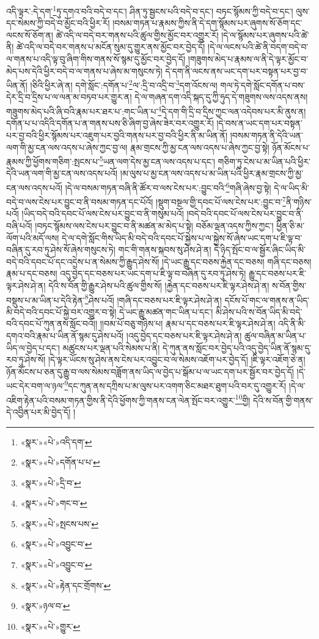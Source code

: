 འདི་ལྟར་:དེ་དག་\footnote{«སྣར་»«པེ་»འདི་དག་}ཏུ་དགའ་བའི་བདེ་བ་དང་། ཤིན་ཏུ་སྦྱངས་པའི་བདེ་བ་དང་། བཏང་སྙོམས་ཀྱི་བདེ་བ་དང་། ལུས་དང་སེམས་ཀྱི་བདེ་བ་མྱོང་བའི་ཕྱིར་རོ། །བསམ་གཏན་པ་རྣམས་ཀྱིས་ནི་དེ་དག་སྙོམས་པར་ཞུགས་སོ་ཅོག་དང་ལངས་སོ་ཅོག་ན། ཚེ་འདི་ལ་བདེ་བར་གནས་པའི་ཚུལ་གྱིས་མྱོང་བར་འགྱུར་རོ། །དེ་ལ་སྙོམས་པར་ཞུགས་པའི་ཚེ་ནི། ཚེ་འདི་ལ་བདེ་བར་གནས་པ་མངོན་སུམ་དུ་གྱུར་ནས་མྱོང་བར་བྱེད་དོ། །དེ་ལ་ལངས་པའི་ཚེ་ནི་བདག་བདེ་བ་ལ་གནས་པ་འདི་ལྟ་བུ་ཞིག་གིས་གནས་སོ་སྙམ་དུ་མྱོང་བར་བྱེད་དོ། །གཟུགས་མེད་པ་རྣམས་ལ་ནི་དེ་ལྟར་མྱོང་བ་མེད་པས་དེའི་ཕྱིར་བདེ་བ་ལ་གནས་པ་ཞེས་མ་གསུངས་ཏེ། དེ་དག་ནི་ལངས་ནས་ཡང་དག་པར་བསྟན་པར་བྱ་བ་ཡིན་ནོ། །ཅིའི་ཕྱིར་ཞེ་ན། དགེ་སློང་:དགོན་པ་\footnote{«སྣར་»«པེ་»དགོན་པ་པ་}ལ་:དྲི་བ་འདྲི་བ་\footnote{«སྣར་»«པེ་»དྲི་བ་}དག་འོངས་ལ། གལ་ཏེ་དགེ་སློང་དགོན་པ་བས་དེར་དྲི་བ་དྲིས་པ་ལ་ལན་མ་བཏབ་པར་གྱུར་ན། དེ་ལ་གཞན་དག་འདི་སྐད་དུ་ཀྱི་ཧུད་དེ་གཟུགས་ལས་འདས་ནས། གཟུགས་མེད་པའི་ཞི་བའི་རྣམ་པར་ཐར་པ་:གང་ཡིན་པ་\footnote{«སྣར་»«པེ་»གང་བ་}དེ་དག་གི་དྲི་བ་དྲིས་ཀྱང་ལན་འདེབས་པར་མི་ནུས་ན། དགོན་པ་པ་འདིའི་དགོན་པ་ན་གནས་པས་ཅི་ཞིག་བྱ་ཞེས་ཟེར་བར་འགྱུར་རོ། །དེ་བས་ན་ཡང་དག་པར་བསྟན་པར་བྱ་བའི་ཕྱིར་སྙོམས་པར་འཇུག་པར་བྱའི་གནས་པར་བྱ་བའི་ཕྱིར་ནི་མ་ཡིན་ནོ། །བསམ་གཏན་ནི་དེའི་ཡན་ལག་གི་མྱ་ངན་ལས་འདས་པ་ཞེས་ཀྱང་བྱ་ལ། རྣམ་གྲངས་ཀྱི་མྱ་ངན་ལས་འདས་པ་ཞེས་ཀྱང་བྱ་སྟེ། ཉོན་མོངས་པ་རྣམས་ཀྱི་ཕྱོགས་གཅིག་:སྤངས་པ་\footnote{«སྣར་»«པེ་»སྤངས་པས་}ཡན་ལག་དེས་མྱ་ངན་ལས་འདས་པ་དང་། གཅིག་ཏུ་ངེས་པ་མ་ཡིན་པའི་ཕྱིར་དེའི་ཡན་ལག་གི་མྱ་ངན་ལས་འདས་པའོ། །མ་ལུས་པ་མྱ་ངན་ལས་འདས་པ་མ་ཡིན་པའི་ཕྱིར་རྣམ་གྲངས་ཀྱི་མྱ་ངན་ལས་འདས་པའོ། །དེ་ལ་བསམ་གཏན་བཞི་ནི་ཚོར་བ་ལས་ངེས་པར་:བྱུང་བའི་\footnote{«སྣར་»«པེ་»འབྱུང་བ་}གཞི་ཞེས་བྱ་སྟེ། དེ་ལ་ཡིད་མི་བདེ་བ་ལས་ངེས་པར་བྱུང་བ་ནི་བསམ་གཏན་དང་པོའོ། །སྡུག་བསྔལ་གྱི་དབང་པོ་ལས་ངེས་པར་:བྱུང་བ་\footnote{«སྣར་»«པེ་»འབྱུང་བ་}ནི་གཉིས་པའོ། །ཡིད་བདེ་བའི་དབང་པོ་ལས་ངེས་པར་བྱུང་བ་ནི་གསུམ་པའོ། །བདེ་བའི་དབང་པོ་ལས་ངེས་པར་བྱུང་བ་ནི་བཞི་པའོ། །བཏང་སྙོམས་ལས་ངེས་པར་བྱུང་བ་ནི་མཚན་མ་མེད་པ་སྟེ། བཅོམ་ལྡན་འདས་ཀྱིས་ཀྱང་། ཕྱིན་ཅི་མ་ལོག་པའི་མདོ་ལས། དེ་ལ་དགེ་སློང་གིས་ཡིད་མི་བདེ་བའི་དབང་པོ་སྐྱེས་པ་ལ་སྐྱེས་སོ་ཞེས་ཡང་དག་པ་ཇི་ལྟ་བ་བཞིན་དུ་རབ་ཏུ་ཤེས་སོ་ཞེས་གསུངས་ཏེ། གང་གི་གནས་སྐབས་སུ་ཤེས་ཤེ་ན། དེ་ཉིད་སྤོང་བ་ལ་སྦྱོར་ཞིང་ཡིད་མི་བདེ་བའི་དབང་པོ་དང་འདྲེས་པ་ན་སེམས་ཀྱི་རྒྱུད་ཤེས་སོ། །དེ་ཡང་རྒྱུ་དང་བཅས་རྐྱེན་དང་བཅས། གཞི་དང་བཅས། རྣམ་པ་དང་བཅས། འདུ་བྱེད་དང་བཅས་པར་ཡང་དག་པ་ཇི་ལྟ་བ་བཞིན་དུ་རབ་ཏུ་ཤེས་ཏེ། རྒྱུ་དང་བཅས་པར་ཇི་ལྟར་ཤེས་ཤེ་ན། དེའི་ས་བོན་གྱི་རྒྱུར་ཤེས་པའི་ཚུལ་གྱིས་སོ། །རྐྱེན་དང་བཅས་པར་ཇི་ལྟར་ཤེས་ཤེ་ན། ས་བོན་གྱིས་བསྡུས་པ་མ་ཡིན་པ་དེའི་རྟེན་\footnote{«སྣར་»«པེ་»རྟེན་དང་གྲོགས་}ཤེས་པའོ། །གཞི་དང་བཅས་པར་ཇི་ལྟར་ཤེས་ཤེ་ན། དངོས་པོ་གང་ལ་གནས་ན་ཡིད་མི་བདེ་བའི་དབང་པོ་སྐྱེ་བར་འགྱུར་བ་སྟེ། དེ་ཡང་རྒྱུ་མཚན་གང་ཡིན་པ་དང་། མི་ཤེས་པའི་ས་བོན་ཡིད་མི་བདེ་བའི་དབང་པོ་ཀུན་ནས་སློང་བའོ།། །།བམ་པོ་བཅུ་གཉིས་པ། རྣམ་པ་དང་བཅས་པར་ཇི་ལྟར་ཤེས་ཤེ་ན། འདི་ནི་མི་དགའ་བའི་རྣམ་པ་ཡིན་ནོ་སྙམ་དུ་ཤེས་པའོ། །འདུ་བྱེད་དང་བཅས་པར་ཇི་ལྟར་ཤེས་ཤེ་ན། ཚུལ་བཞིན་མ་ཡིན་པ་ཡིད་ལ་བྱེད་པ་དང་། མཚུངས་པར་ལྡན་པའི་སེམས་པ་ནི། དེ་ཀུན་ནས་སློང་བར་བྱེད་པའི་འདུ་བྱེད་ཡིན་ནོ་སྙམ་དུ་རབ་ཏུ་ཤེས་སོ། །དེ་ལྟར་ཡོངས་སུ་ཤེས་ནས་ངེས་པར་འབྱུང་བ་ལ་སེམས་འཇོག་པར་བྱེད་དོ། །ཇི་ལྟར་འཇོག་ཅེ་ན། ཉོན་མོངས་པ་ཅན་དུ་རྒྱུ་བ་ལས་སེམས་བཟློག་ནས་ཡིད་ལ་བྱེད་པ་སྒོམ་པ་ལ་ཡང་དག་པར་སྦྱོར་བར་བྱེད་དོ། །དེ་ཡང་དེར་བག་ལ་ཉལ་\footnote{«སྣར་»ཉལ་བ་}དང་ཀུན་ནས་དཀྲིས་པ་མ་ལུས་པར་འགག་ཅིང་མཐར་ཐུག་པའི་བར་དུ་འགྱུར་རོ། །དེ་ལ་འཇིག་རྟེན་པའི་བསམ་གཏན་གྱིས་ནི་དེའི་ཕྱོགས་ཀྱི་གནས་ངན་ལེན་སྤོང་བར་འགྱུར་\footnote{«སྣར་»«པེ་»གྱུར་}གྱི། དེའི་ས་བོན་གྱི་གནས་དེ་འབྱིན་པར་མི་བྱེད་དོ། །
